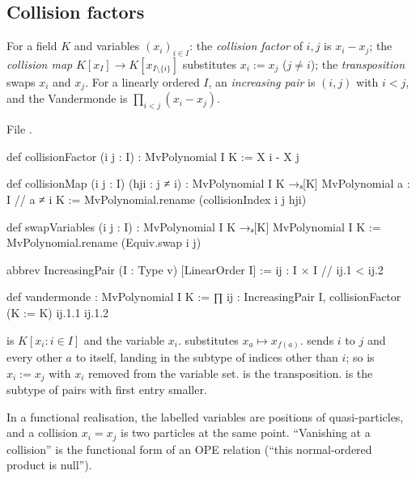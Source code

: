 \subsection{Collision factors}

\begin{definition}\label{l20:def:collision}
For a field $K$ and variables $(x_i)_{i\in I}$: the \emph{collision factor} of $i,j$ is $x_i-x_j$; the \emph{collision map}
$K[x_I]\to K[x_{I\setminus\{i\}}]$ substitutes $x_i:=x_j$ ($j\ne i$); the \emph{transposition} swaps $x_i$ and $x_j$. For a linearly
ordered $I$, an \emph{increasing pair} is $(i,j)$ with $i<j$, and the Vandermonde is $\prod_{i<j}(x_i-x_j)$.
\end{definition}
\noindent File .
\begin{leancode}
def collisionFactor (i j : I) : MvPolynomial I K :=
  X i - X j

def collisionMap (i j : I) (hji : j ≠ i) :
    MvPolynomial I K →ₐ[K] MvPolynomial {a : I // a ≠ i} K :=
  MvPolynomial.rename (collisionIndex i j hji)

def swapVariables (i j : I) : MvPolynomial I K →ₐ[K] MvPolynomial I K :=
  MvPolynomial.rename (Equiv.swap i j)

abbrev IncreasingPair (I : Type v) [LinearOrder I] :=
  {ij : I × I // ij.1 < ij.2}

def vandermonde : MvPolynomial I K :=
  ∏ ij : IncreasingPair I,
    collisionFactor (K := K) ij.1.1 ij.1.2
\end{leancode}

\begin{dictionary}
 is $K[x_i:i\in I]$ and  the variable $x_i$.  substitutes $x_a\mapsto x_{f(a)}$.
 sends $i$ to $j$ and every other $a$ to itself, landing in the subtype  of
indices other than $i$; so  is $x_i:=x_j$ with $x_i$ removed from the variable set.  is the
transposition.  is the subtype of pairs with first entry smaller.
\end{dictionary}

\begin{physics}
In a functional realisation, the labelled variables are positions of quasi-particles, and a collision $x_i=x_j$ is two particles at
the same point. ``Vanishing at a collision'' is the functional form of an OPE relation (``this normal-ordered product is null'').
\end{physics}

